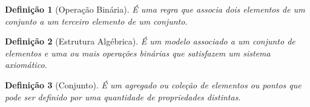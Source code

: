 \documentclass{book}
\newtheorem{defi}{Definição}[section]
\begin{document}
            \begin{defi}[Operação Binária]\label{defi:operacao-binaria}
                É uma regra que associa dois elementos de um conjunto a um terceiro elemento de um conjunto.
            \end{defi}

            \begin{defi}[Estrutura Algébrica]\label{defi:estrutura-algebrica}
                É um modelo associado a um conjunto de elementos e uma ou mais operações binárias que satisfazem um sistema axiomático.
            \end{defi}


            \begin{defi}[Conjunto]\label{defi:conjunto}
                É um agregado ou coleção de elementos ou pontos que pode ser definido por uma quantidade de propriedades distintas.
            \end{defi}


    
\end{document}
